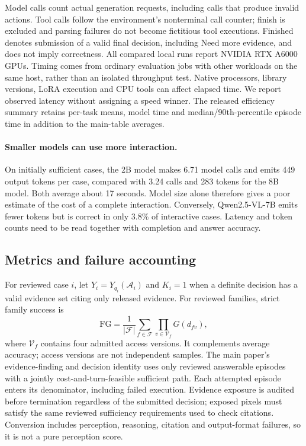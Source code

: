 Model calls count actual generation requests, including calls that produce invalid actions.
Tool calls follow the environment's nonterminal call counter; finish is excluded and parsing failures do not become fictitious tool executions.
Finished denotes submission of a valid final decision, including Need more evidence, and does not imply correctness.
All compared local runs report NVIDIA RTX A6000 GPUs.
Timing comes from ordinary evaluation jobs with other workloads on the same host, rather than an isolated throughput test.
Native processors, library versions, LoRA execution and CPU tools can affect elapsed time.
We report observed latency without assigning a speed winner.
The released efficiency summary retains per-task means, model time and median/90th-percentile episode time in addition to the main-table averages.

\paragraph{Smaller models can use more interaction.}
On initially sufficient cases, the 2B model makes 6.71 model calls and emits 449 output tokens per case, compared with 3.24 calls and 283 tokens for the 8B model.
Both average about 17 seconds.
Model size alone therefore gives a poor estimate of the cost of a complete interaction.
Conversely, Qwen2.5-VL-7B emits fewer tokens but is correct in only 3.8\% of interactive cases.
Latency and token counts need to be read together with completion and answer accuracy.

\subsection{Metrics and failure accounting}
For reviewed case \(i\), let \(Y_i=Y_{q_i}(\mathcal{A}_i)\) and \(K_i=1\) when a definite decision has a valid evidence set citing only released evidence.
For reviewed families, strict family success is
\begin{equation}
\mathrm{FG}=\frac{1}{|\mathcal{F}|}
\sum_{f\in\mathcal{F}}\prod_{v\in\mathcal{V}_f}G(d_{fv}),
\end{equation}
where \(\mathcal{V}_f\) contains four admitted access versions.
It complements average accuracy; access versions are not independent samples.
The main paper's evidence-finding and decision identity uses only reviewed answerable episodes with a jointly cost-and-turn-feasible sufficient path. Each attempted episode enters its denominator, including failed execution. Evidence exposure is audited before termination regardless of the submitted decision; exposed pixels must satisfy the same reviewed sufficiency requirements used to check citations. Conversion includes perception, reasoning, citation and output-format failures, so it is not a pure perception score.

